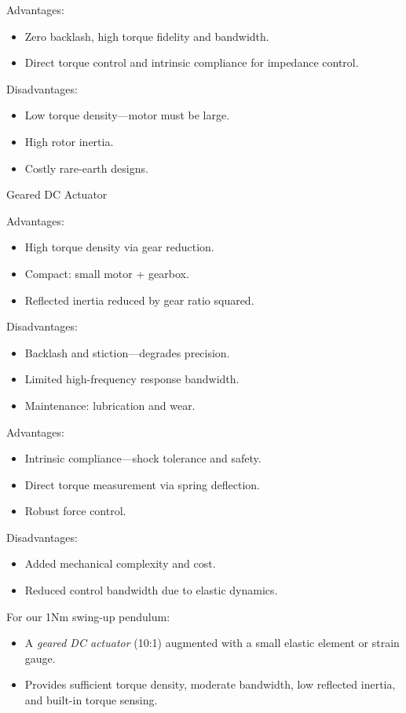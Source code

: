 \documentclass[12pt,a4paper]{article}
\begin{document}

Advantages:
\begin{itemize}
  \item Zero backlash, high torque fidelity and bandwidth.
  \item Direct torque control and intrinsic compliance for impedance control.
\end{itemize}

Disadvantages:
\begin{itemize}
  \item Low torque density—motor must be large.
  \item High rotor inertia.
  \item Costly rare-earth designs.
\end{itemize}


Geared DC Actuator

Advantages:
\begin{itemize}
  \item High torque density via gear reduction.
  \item Compact: small motor + gearbox.
  \item Reflected inertia reduced by gear ratio squared.
\end{itemize}
Disadvantages:
\begin{itemize}
  \item Backlash and stiction—degrades precision.
  \item Limited high-frequency response bandwidth.
  \item Maintenance: lubrication and wear.
\end{itemize}


Advantages:
\begin{itemize}
  \item Intrinsic compliance—shock tolerance and safety.
  \item Direct torque measurement via spring deflection.
  \item Robust force control.
\end{itemize}
Disadvantages:
\begin{itemize}
  \item Added mechanical complexity and cost.
  \item Reduced control bandwidth due to elastic dynamics.
\end{itemize}

For our 1Nm swing-up pendulum:
\begin{itemize}
  \item A \emph{geared DC actuator} (10:1) augmented with a small elastic element or strain gauge.
  \item Provides sufficient torque density, moderate bandwidth, low reflected inertia, and built-in torque sensing.
\end{itemize}
\end{document}
